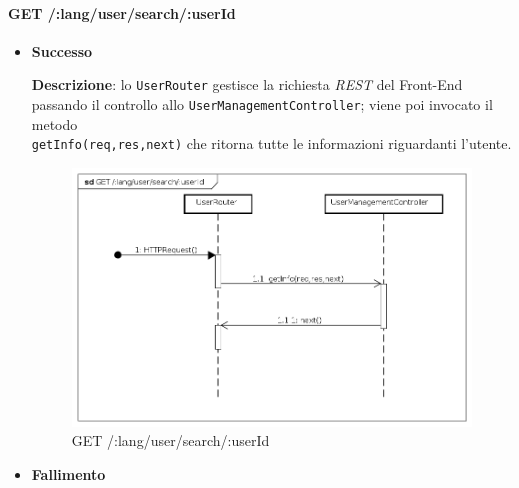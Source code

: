 \paragraph{GET /:lang/user/search/:userId}
\begin{itemize}
\item \textbf{Successo}

\textbf{Descrizione}: lo \texttt{UserRouter} gestisce la richiesta \textit{REST} del Front-End passando il controllo allo \texttt{UserManagementController}; viene poi invocato il metodo\\ \texttt{getInfo(req,res,next)} che ritorna tutte le informazioni riguardanti l'utente.

\begin{figure}[ht]
	\centering
	\includegraphics[scale=0.45]{UML/DiagrammiDiSequenza/Back-end/GET__lang_user_search__userId.png}
	\caption{GET /:lang/user/search/:userId}
\end{figure}
\FloatBarrier

\item \textbf{Fallimento}
\end{itemize}

